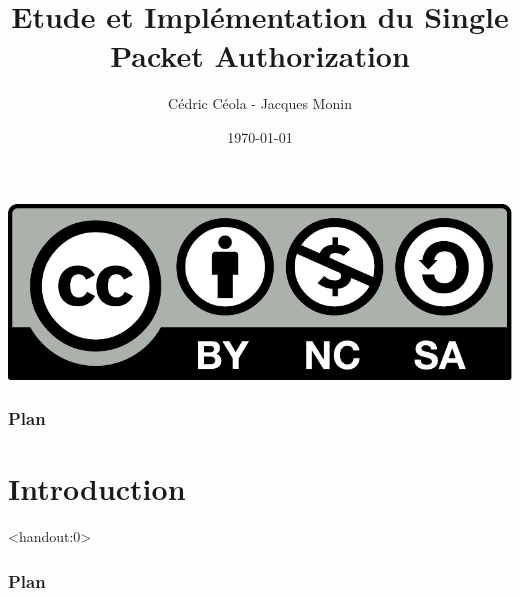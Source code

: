 %
%

\usepackage[french]{babel}

\newcommand{\highlight}[1]{\textcolor{structure.fg}{\bfseries #1}}

\title{Etude et Implémentation du Single Packet Authorization}

\author[CJ]{Cédric Céola - Jacques Monin\\[-.25em]}





\date{\today}



\begin{frame}
  \vspace{3.5em}
  \titlepage

  \begin{center}
    \includegraphics[scale=.2]{cc-by-nc-sa.pdf}
  \end{center}
\end{frame}

\begin{frame}
  \frametitle{Plan}
  \tableofcontents[subsectionstyle=hide]
\end{frame}

\section{Introduction}

\begin{frame}<handout:0>
  \frametitle{Plan}
  \tableofcontents[currentsection,subsectionstyle=hide]
\end{frame}

